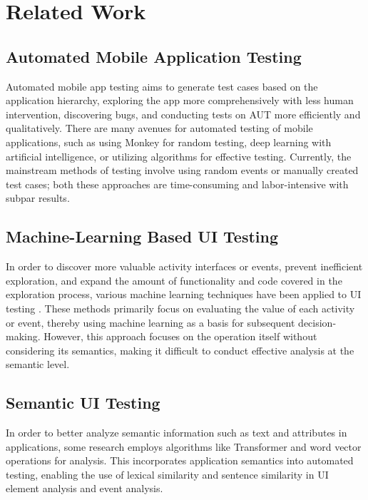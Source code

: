 \documentclass[conference]{IEEEtran}
\begin{document}
\section{Related Work}

\subsection{Automated Mobile Application Testing}

Automated mobile app testing aims to generate test cases based on the application hierarchy, exploring the app more comprehensively with less human intervention, discovering bugs, and conducting tests on AUT more efficiently and qualitatively. There are many avenues for automated testing of mobile applications, such as using Monkey for random testing, deep learning\cite{DeepLearning} with artificial intelligence, or utilizing algorithms for effective testing. Currently, the mainstream methods of testing involve using random events or manually created test cases; both these approaches are time-consuming and labor-intensive with subpar results.

\subsection{Machine-Learning Based UI Testing}

In order to discover more valuable activity interfaces or events, prevent inefficient exploration, and expand the amount of functionality and code covered in the exploration process, various machine learning techniques have been applied to UI testing \cite{romdhana_deep_2022} \cite{yazdanibanafshedaragh_deep_2022} \cite{pan_reinforcement_2020}. These methods primarily focus on evaluating the value of each activity or event, thereby using machine learning as a basis for subsequent decision-making. However, this approach focuses on the operation itself without considering its semantics, making it difficult to conduct effective analysis at the semantic level.

\subsection{Semantic UI Testing}

In order to better analyze semantic information such as text and attributes in applications, some research employs algorithms like Transformer and word vector operations for analysis. This incorporates application semantics into automated testing, enabling the use of lexical similarity and sentence similarity in UI element analysis and event analysis. \cite{li_screen2vec_2021} \cite{mikolov_distributed_2013} \cite{li_mapping_2020}
\end{document}
